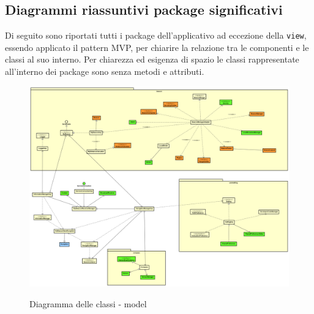 \documentclass[../DefinizioneDiProdotto.tex]{subfiles}
\begin{document}
	
\subsection{Diagrammi riassuntivi package significativi}
Di seguito sono riportati tutti i package dell'applicativo ad eccezione della \verb|view|, essendo applicato il pattern MVP, per chiarire la relazione tra le componenti e le classi al suo interno. Per chiarezza ed esigenza di spazio le classi rappresentate all'interno dei package sono senza metodi e attributi.

\begin{figure}[H]
	\includegraphics[angle=90,width=\textwidth, height=\textheight, keepaspectratio]{diagrams/ModelCompleteNoMethods/PNGpackage/model}
	\label{modelPackage}
	\caption{Diagramma delle classi - model}
\end{figure}
\end{document}
